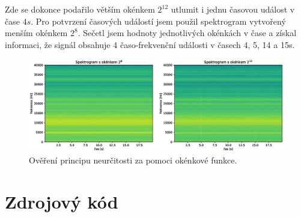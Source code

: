 \documentclass{article}
\begin{document}
			\noindent
			Zde se dokonce podařilo větším okénkem \(2^{12}\) utlumit i jednu časovou událost v čase \(4s\). Pro potvrzení časových událostí jsem použil spektrogram vytvořený menším okénkem \(2^{8}\). Sečetl jsem hodnoty jednotlivých okénkách v čase a získal informaci, že signál obsahuje 4 časo-frekvenční události v časech 4, 5, 14 a 15s.
				\begin{figure}[H]
					\centering
					\includegraphics[width=\textwidth]{./Graphics/okenkova_funkce}
					\caption{Ověření principu neurčitosti za pomoci okénkové funkce.}
					\label{graph:okenkova_funkce}
				\end{figure}
	\newpage
	\section{Zdrojový kód}
		
	
\end{document}
